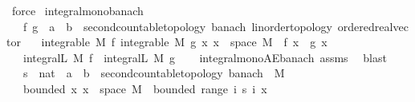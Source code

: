\begin{isabellebody}
\ force%
\endisatagproof
{\isafoldproof}%
%
\isadelimproof
\isanewline
%
\endisadelimproof
\isanewline
{}\isamarkupfalse%
\ integral{\isacharunderscore}{\kern0pt}mono{\isacharunderscore}{\kern0pt}banach{\isacharcolon}{\kern0pt}\isanewline
\ \ \ f\ g\ {\isacharcolon}{\kern0pt}{\isacharcolon}{\kern0pt}\ {\isachardoublequoteopen}{\isacharprime}{\kern0pt}a\ {\isasymRightarrow}\ {\isacharprime}{\kern0pt}b\ {\isacharcolon}{\kern0pt}{\isacharcolon}{\kern0pt}\ {\isacharbraceleft}{\kern0pt}second{\isacharunderscore}{\kern0pt}countable{\isacharunderscore}{\kern0pt}topology{\isacharcomma}{\kern0pt}\ banach{\isacharcomma}{\kern0pt}\ linorder{\isacharunderscore}{\kern0pt}topology{\isacharcomma}{\kern0pt}\ ordered{\isacharunderscore}{\kern0pt}real{\isacharunderscore}{\kern0pt}vector{\isacharbraceright}{\kern0pt}{\isachardoublequoteclose}\isanewline
\ \ \ {\isachardoublequoteopen}integrable\ M\ f{\isachardoublequoteclose}\ {\isachardoublequoteopen}integrable\ M\ g{\isachardoublequoteclose}\ {\isachardoublequoteopen}{\isasymAnd}x{\isachardot}{\kern0pt}\ x\ {\isasymin}\ space\ M\ {\isasymLongrightarrow}\ f\ x\ {\isasymle}\ g\ x{\isachardoublequoteclose}\isanewline
\ \ \ {\isachardoublequoteopen}integral\isactrlsup L\ M\ f\ {\isasymle}\ integral\isactrlsup L\ M\ g{\isachardoublequoteclose}\isanewline
%
\isadelimproof
\ \ %
\endisadelimproof
%
\isatagproof
{}\isamarkupfalse%
\ integral{\isacharunderscore}{\kern0pt}mono{\isacharunderscore}{\kern0pt}AE{\isacharunderscore}{\kern0pt}banach\ assms\ \isamarkupfalse%
\ blast%
\endisatagproof
{\isafoldproof}%
%
\isadelimproof
%
\endisadelimproof
%
\isadelimdocument
%
\endisadelimdocument
%
\isatagdocument
%
\isamarkuptrue%
%
\endisatagdocument
{\isafolddocument}%
%
\isadelimdocument
%
\endisadelimdocument
{}\isamarkupfalse%
\isanewline
\ \ \ s\ {\isacharcolon}{\kern0pt}{\isacharcolon}{\kern0pt}\ {\isachardoublequoteopen}nat\ {\isasymRightarrow}\ {\isacharprime}{\kern0pt}a\ {\isasymRightarrow}\ {\isacharprime}{\kern0pt}b\ {\isacharcolon}{\kern0pt}{\isacharcolon}{\kern0pt}\ {\isacharbraceleft}{\kern0pt}second{\isacharunderscore}{\kern0pt}countable{\isacharunderscore}{\kern0pt}topology{\isacharcomma}{\kern0pt}\ banach{\isacharbraceright}{\kern0pt}{\isachardoublequoteclose}\ \ M\isanewline
\ \ \ bounded{\isacharcolon}{\kern0pt}\ {\isachardoublequoteopen}{\isasymAnd}x{\isachardot}{\kern0pt}\ x\ {\isasymin}\ space\ M\ {\isasymLongrightarrow}\ bounded\ {\isacharparenleft}{\kern0pt}range\ {\isacharparenleft}{\kern0pt}{\isasymlambda}i{\isachardot}{\kern0pt}\ s\ i\ x{\isacharparenright}{\kern0pt}{\isacharparenright}{\kern0pt}{\isachardoublequoteclose}\isanewline

\end{isabellebody}
